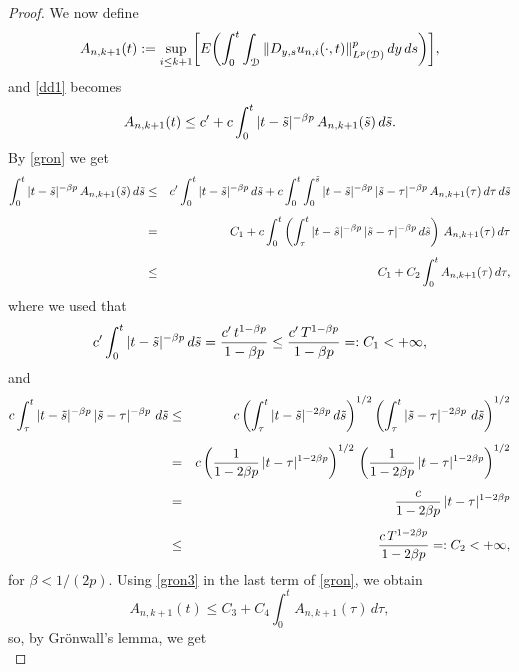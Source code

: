 \documentclass[reqno]{amsart}
\numberwithin{equation}{section}
\newcommand{\cd}{\mathcal{D}}
\begin{document}
\begin{proof}
\noindent
We now define
\begin{align*}
A_{n,k+1}(t):= \underset{i\leq k+1}{\text{sup}}\bigg{[}E\biggl{(}\int_0^t\int_{\cd}\|D_{y,s}u_{n,i}(\cdot,t)\|^p_{L^p(\cd)}\,dy\,ds\biggr{)}\bigg{]},
\end{align*}
and \eqref{dd1} becomes
\begin{equation}\label{gron}
A_{n,k+1}(t) \leq c'+ c\int_0^t  |t-\Tilde{s}|^{-\beta p} \, A_{n,k+1}(\Tilde{s})\, d\Tilde{s}.
\end{equation}
By \eqref{gron} we get %
\begin{eqnarray}\label{gron2}
\int_0^t  |t-\Tilde{s}|^{-\beta p} \, A_{n,k+1}(\Tilde{s})\, d\Tilde{s}
&\leq&
c' \int_0^t  |t-\Tilde{s}|^{-\beta p} \, d\Tilde{s}
+
c\int_0^t \int_0^{\tilde{s}} |t-\Tilde{s}|^{-\beta p}\, |\tilde{s}-\tau|^{-\beta p} \, A_{n,k+1}(\tau)\, d\tau \, d\tilde{s}
\nonumber
\\[0.5em]
&=&
C_1
+
c \int_0^t \left( \int_{\tau}^{t} |t-\Tilde{s}|^{-\beta p}\, |\tilde{s}-\tau|^{-\beta p} \, d\tilde{s} \right) \, A_{n,k+1}(\tau) \, d\tau
\nonumber
\\[0.5em]
&\leq& C_1 + C_2 \int_0^t   A_{n,k+1}(\tau) \, d\tau , \label{gron3}
\end{eqnarray}
where we used that
$$ c'\int_0^t  |t-\Tilde{s}|^{-\beta p} \, d\Tilde{s} = \frac{c'\, t^{1- \beta p}}{1-\beta p} \leq \frac{c'\, T^{1- \beta p}}{1-\beta p} =: C_1  <+\infty , $$
and
\begin{eqnarray}
c\int_\tau^t|t-\Tilde{s}|^{-\beta p} \, |\tilde{s}-\tau|^{-\beta p} \,  \,d\tilde{s}
& \leq &
c\left(\int_\tau^t|t-\Tilde{s}|^{-2 \beta p} \,d\tilde{s}\right)^{1/2} 
\left( \int_\tau^t|\tilde{s}-\tau|^{-2 \beta p} \, \,d\tilde{s}\right)^{1/2}
\nonumber\\[0.5em]
&=&
c\left(\frac{1}{1-2 \beta p}\, |t-\tau|^{1-2 \beta p}\right)^{1/2} \, \left(\frac{1}{1-2 \beta p}\, |t-\tau|^{1-2 \beta p}\right)^{1/2}
\nonumber\\[0.5em]
&=&
\frac{c}{1-2 \beta p}\, |t-\tau|^{1-2 \beta p}
\nonumber\\[0.5em]
&\leq &
\frac{c\, T^{1-2 \beta p}}{1-2 \beta p} =: C_2  <+\infty ,\label{hineq}
\end{eqnarray}
for $ \beta<1/(2p). $ Using \eqref{gron3} in the last term of \eqref{gron}, we obtain
$$ A_{n,k+1}(t) \leq C_3 + C_4 \int_0^t A_{n,k+1}(\tau)\, d\tau , $$
so, by Gr\"onwall's lemma, we get
\begin{equation*}

\end{equation*}
\end{proof}
\end{document}
